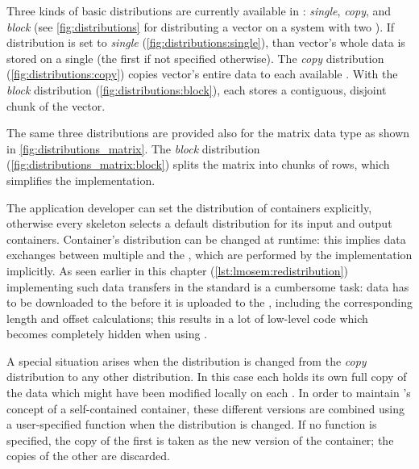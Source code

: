 Three kinds of basic distributions are currently available in \SkelCL:
\emph{single}, \emph{copy}, and \emph{block} (see \autoref{fig:distributions} for distributing a vector on a system with two \GPUs).
If distribution is set to \emph{single} (\autoref{fig:distributions:single}), than vector's whole data is stored on a single \GPU (the first \GPU if not specified otherwise).
The \emph{copy} distribution (\autoref{fig:distributions:copy}) copies vector's entire data to each available \GPU.
With the \emph{block} distribution (\autoref{fig:distributions:block}), each \GPU stores a contiguous, disjoint chunk of the vector.

The same three distributions are provided also for the matrix data type as shown in \autoref{fig:distributions_matrix}.
The \emph{block} distribution (\autoref{fig:distributions_matrix:block}) splits the matrix into chunks of rows, which simplifies the implementation.


The application developer can set the distribution of containers explicitly, otherwise every skeleton selects a default distribution for its input and output containers.
Container's distribution can be changed at runtime:
this implies data exchanges between multiple \GPUs and the \CPU, which are performed by the \SkelCL implementation implicitly.
As seen earlier in this chapter (\autoref{lst:lmosem:redistribution}) implementing such data transfers in the standard \OpenCL is a cumbersome task:
data has to be downloaded to the \CPU before it is uploaded to the \GPUs, including the corresponding length and offset calculations;
this results in a lot of low-level code which becomes completely hidden when using \SkelCL.

A special situation arises when the distribution is changed from the \emph{copy} distribution to any other distribution.
In this case each \GPU holds its own full copy of the data which might have been modified locally on each \GPU.
In order to maintain \SkelCL's concept of a self-contained container, these different versions are combined using a user-specified function when the distribution is changed.
If no function is specified, the copy of the first \GPU is taken as the new version of the container; the copies of the other \GPUs are discarded.


